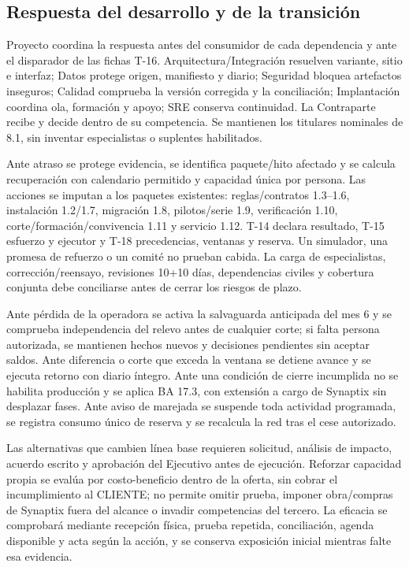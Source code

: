 \subsection{Respuesta del desarrollo y de la transición}\label{sec:sd8-respuesta-implantacion}
Proyecto coordina la respuesta antes del consumidor de cada dependencia y ante el disparador de las fichas T-16. Arquitectura/Integración resuelven variante, sitio e interfaz; Datos protege origen, manifiesto y diario; Seguridad bloquea artefactos inseguros; Calidad comprueba la versión corregida y la conciliación; Implantación coordina ola, formación y apoyo; SRE conserva continuidad. La Contraparte recibe y decide dentro de su competencia. Se mantienen los titulares nominales de 8.1, sin inventar especialistas o suplentes habilitados.

Ante atraso se protege evidencia, se identifica paquete/hito afectado y se calcula recuperación con calendario permitido y capacidad única por persona. Las acciones se imputan a los paquetes existentes: reglas/contratos 1.3--1.6, instalación 1.2/1.7, migración 1.8, pilotos/serie 1.9, verificación 1.10, corte/formación/convivencia 1.11 y servicio 1.12. T-14 declara resultado, T-15 esfuerzo y ejecutor y T-18 precedencias, ventanas y reserva. Un simulador, una promesa de refuerzo o un comité no prueban cabida. La carga de especialistas, corrección/reensayo, revisiones 10+10 días, dependencias civiles y cobertura conjunta debe conciliarse antes de cerrar los riesgos de plazo.

Ante pérdida de la operadora se activa la salvaguarda anticipada del mes 6 y se comprueba independencia del relevo antes de cualquier corte; si falta persona autorizada, se mantienen hechos nuevos y decisiones pendientes sin aceptar saldos. Ante diferencia o corte que exceda la ventana se detiene avance y se ejecuta retorno con diario íntegro. Ante una condición de cierre incumplida no se habilita producción y se aplica BA 17.3, con extensión a cargo de Synaptix sin desplazar fases. Ante aviso de marejada se suspende toda actividad programada, se registra consumo único de reserva y se recalcula la red tras el cese autorizado.

Las alternativas que cambien línea base requieren solicitud, análisis de impacto, acuerdo escrito y aprobación del Ejecutivo antes de ejecución. Reforzar capacidad propia se evalúa por costo-beneficio dentro de la oferta, sin cobrar el incumplimiento al CLIENTE; no permite omitir prueba, imponer obra/compras de Synaptix fuera del alcance o invadir competencias del tercero. La eficacia se comprobará mediante recepción física, prueba repetida, conciliación, agenda disponible y acta según la acción, y se conserva exposición inicial mientras falte esa evidencia. \parencites[arts.~17--18, 72 y 76; pp.~12--14, 38--39]{sd8-ba}[RT-19.03; RT-20.01--06; pp.~33, 35]{sd8-bt}
